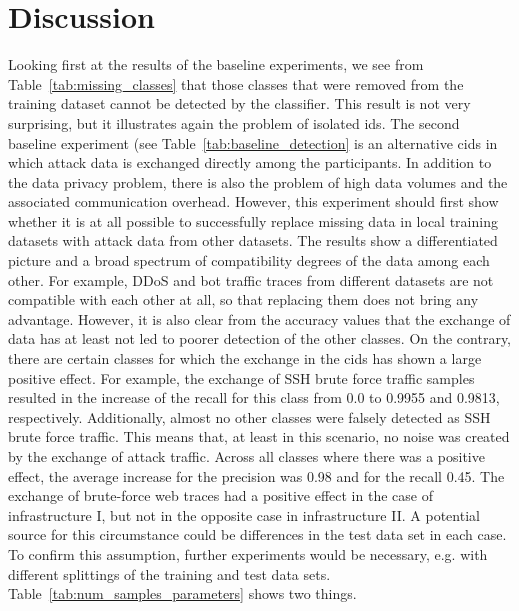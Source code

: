 \documentclass[../../main.tex]{subfiles}
\begin{document}
\section{Discussion}\label{sec:discussion}

Looking first at the results of the baseline experiments, we see from Table~\ref{tab:missing_classes} that those classes that were removed from the training dataset cannot be detected by the classifier. This result is not very surprising, but it illustrates again the problem of isolated \gls{ids}. The second baseline experiment (see Table~\ref{tab:baseline_detection} is an alternative \gls{cids} in which attack data is exchanged directly among the participants. In addition to the data privacy problem, there is also the problem of high data volumes and the associated communication overhead. However, this experiment should first show whether it is at all possible to successfully replace missing data in local training datasets with attack data from other datasets. The results show a differentiated picture and a broad spectrum of compatibility degrees of the data among each other. For example, DDoS and bot traffic traces from different datasets are not compatible with each other at all, so that replacing them does not bring any advantage. However, it is also clear from the accuracy values that the exchange of data has at least not led to poorer detection of the other classes. On the contrary, there are certain classes for which the exchange in the \gls{cids} has shown a large positive effect. For example, the exchange of SSH brute force traffic samples resulted in the increase of the recall for this class from 0.0 to 0.9955 and 0.9813, respectively. Additionally, almost no other classes were falsely detected as SSH brute force traffic. This means that, at least in this scenario, no noise was created by the exchange of attack traffic. Across all classes where there was a positive effect, the average increase for the precision was 0.98 and for the recall 0.45. The exchange of brute-force web traces had a positive effect in the case of infrastructure I, but not in the opposite case in infrastructure II. A potential source for this circumstance could be differences in the test data set in each case. To confirm this assumption, further experiments would be necessary, e.g. with different splittings of the training and test data sets. Table~\ref{tab:num_samples_parameters} shows two things. 
\end{document}
